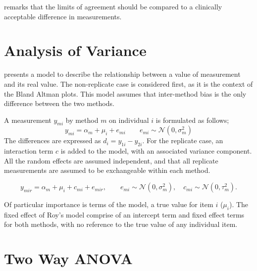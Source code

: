 \documentclass[12pt, a4paper]{report}
\theoremstyle{plain}
\theoremstyle{definition}
\theoremstyle{remark}
\begin{document}
	\citet{Dewitte} remarks that the limits of agreement should be
	compared to a clinically acceptable difference in measurements.

	
	\section{Analysis of Variance }
	
	\citet{BXC2004} presents a model to describe the relationship between a value of measurement and its
	real value. The non-replicate case is considered first, as it is the context of the Bland Altman plots. This model assumes that inter-method bias is the only difference between the two methods.
	
	A measurement $y_{mi}$ by method $m$ on individual $i$ is formulated as follows;
	\begin{equation}
	y_{mi}  = \alpha_{m} + \mu_{i} + e_{mi} \qquad  e_{mi} \sim
	\mathcal{N}(0,\sigma^{2}_{m})
	\end{equation}
	The differences are expressed as $d_{i} = y_{1i} - y_{2i}$. For the replicate case, an interaction term $c$ is added to the model, with an associated variance component. All the random effects are assumed independent, and that all replicate measurements are assumed to be exchangeable within each method.
	
	\begin{equation}
	y_{mir}  = \alpha_{m} + \mu_{i} + c_{mi} + e_{mir}, \qquad  e_{mi}
	\sim \mathcal{N}(0,\sigma^{2}_{m}), \quad c_{mi} \sim \mathcal{N}(0,\tau^{2}_{m}).
	\end{equation}
	
	Of particular importance is terms of the model, a true value for item $i$ ($\mu_{i}$).  The fixed effect of Roy's model comprise of an intercept term and fixed effect terms for both methods, with no reference to the true value of any individual item. 

	
	\bigskip
		\section{Two Way ANOVA}
		
\end{document}
